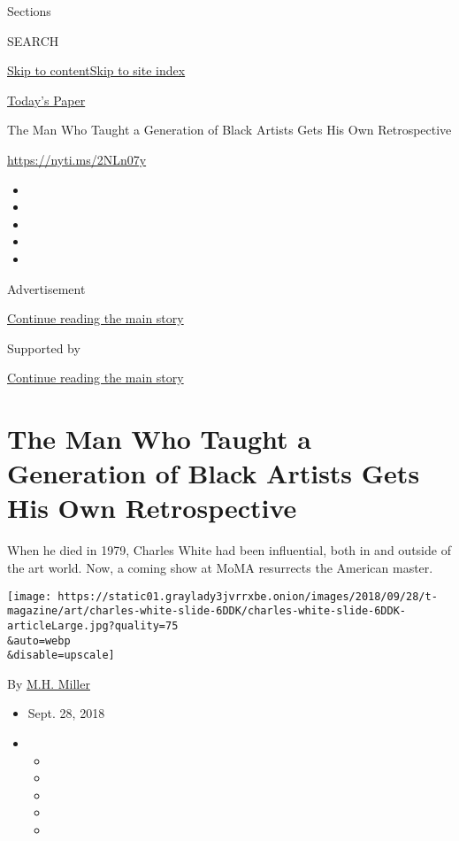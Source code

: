 Sections

SEARCH

\protect\hyperlink{site-content}{Skip to
content}\protect\hyperlink{site-index}{Skip to site index}

\href{https://myaccount.nytimes3xbfgragh.onion/auth/login?response_type=cookie\&client_id=vi}{}

\href{https://www.nytimes3xbfgragh.onion/section/todayspaper}{Today's
Paper}

The Man Who Taught a Generation of Black Artists Gets His Own
Retrospective

\url{https://nyti.ms/2NLn07y}

\begin{itemize}
\item
\item
\item
\item
\item
\end{itemize}

Advertisement

\protect\hyperlink{after-top}{Continue reading the main story}

Supported by

\protect\hyperlink{after-sponsor}{Continue reading the main story}

\hypertarget{the-man-who-taught-a-generation-of-black-artists-gets-his-own-retrospective}{%
\section{The Man Who Taught a Generation of Black Artists Gets His Own
Retrospective}\label{the-man-who-taught-a-generation-of-black-artists-gets-his-own-retrospective}}

When he died in 1979, Charles White had been influential, both in and
outside of the art world. Now, a coming show at MoMA resurrects the
American master.

\texttt{[image: https://static01.graylady3jvrrxbe.onion/images/2018/09/28/t-magazine/art/charles-white-slide-6DDK/charles-white-slide-6DDK-articleLarge.jpg?quality=75\\\&auto=webp\\\&disable=upscale]}

By \href{https://www.nytimes3xbfgragh.onion/by/m-h-miller}{M.H. Miller}

\begin{itemize}
\item
  Sept. 28, 2018
\item
  \begin{itemize}
  \item
  \item
  \item
  \item
  \item
  \end{itemize}
\end{itemize}

